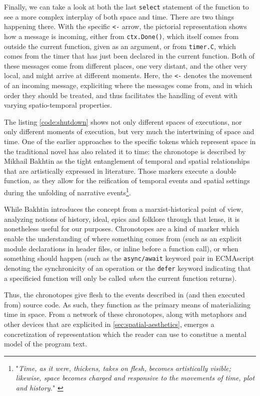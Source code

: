 Finally, we can take a look at both the last \lstinline{select} statement of the function to see a more complex interplay of both space and time. There are two things happening there. With the specific \lstinline{<-} arrow, the pictorial representation shows how a message is incoming, either from \lstinline{ctx.Done()}, which itself comes from outside the current function, given as an argument, or from \lstinline{timer.C}, which comes from the timer that has just been declared in the current function. Both of these messages come from different places, one very distant, and the other very local, and might arrive at different moments. Here, the \lstinline{<-} denotes the movement of an incoming message, expliciting where the messages come from, and in which order they should be treated, and thus facilitates the handling of event with varying spatio-temporal properties.

The listing \ref{code:shutdown} shows not only different spaces of executions, nor only different moments of execution, but very much the intertwining of space and time. One of the earlier approaches to the specific tokens which represent space in the traditional novel has also related it to time: the chronotope is described by Mikhail Bakhtin as the tight entanglement of temporal and spatial relationships that are artistically expressed in literature. Those markers execute a double function, as they allow for the reification of temporal events and spatial settings during the unfolding of narrative events\footnote{"\emph{Time, as it were, thickens, takes on flesh, becomes artistically visible; likewise, space becomes charged and responsive to the movements of time, plot and history.}" \citep{bakhtin_dialogic_1981}}. 

While Bakhtin introduces the concept from a marxist-historical point of view, analyzing notions of history, ideal, epics and folklore through that lense, it is nonetheless useful for our purposes. Chronotopes are a kind of marker which enable the understanding of where something comes from (such as an explicit module declarations in header files, or inline before a function call), or when something should happen (such as the \lstinline{async/await} keyword pair in ECMAscript denoting the synchronicity of an operation or the \lstinline{defer} keyword indicating that a specificied function will only be called \emph{when} the current function returns).

Thus, the chronotopes give flesh to the events described in (and then executed from) source code. As such, they function as the primary means of materializing time in space. From a network of these chronotopes, along with metaphors and other devices that are explicited in \ref{sec:spatial-aesthetics}, emerges a concretization of representation which the reader can use to constitue a mental model of the program text.

